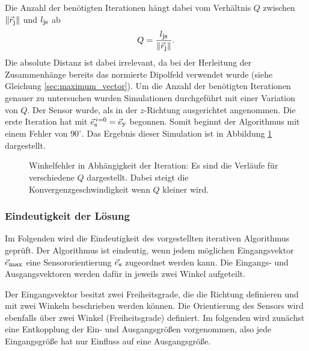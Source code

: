Die Anzahl der benötigten Iterationen hängt dabei vom Verhältnis $Q$ zwischen $\|\vec{r}_{\textrm{\footnotesize{j}}}\|$ und $l_{\textrm{\footnotesize{js}}}$ ab
\begin{equation}
    Q = \frac{l_{\textrm{\footnotesize{js}}}}{\|\vec{r}_{\textrm{\footnotesize{j}}}\|}.
\end{equation}
Die absolute Distanz ist dabei irrelevant, da bei der Herleitung der Zusammenhänge bereits das normierte Dipolfeld verwendet wurde (siehe Gleichung \ref{sec:maximum_vector}). Um die Anzahl der benötigten Iterationen genauer zu untersuchen wurden Simulationen durchgeführt mit einer Variation von $Q$. Der Sensor wurde, als in der $z$-Richtung ausgerichtet angenommen. Die erste Iteration hat mit $\vec{e}_{\textrm{\footnotesize{s}}}^{\,i=0} = \vec{e}_{\textrm{\footnotesize{y}}}$ begonnen. Somit beginnt der Algorithmus mit einem Fehler von $90^\circ$. Das Ergebnis dieser Simulation ist in Abbildung \ref{fig:ConvergenceSpeed} dargestellt.
\begin{figure}
    \centering
    \caption{Winkelfehler in Abhängigkeit der Iteration: Es sind die Verläufe für verschiedene $Q$ dargestellt. Dabei steigt die Konvergenzgeschwindigkeit wenn $Q$ kleiner wird. }
    \label{fig:ConvergenceSpeed}
\end{figure}

\subsubsection{Eindeutigkeit der Lösung}
\label{subsubsection:eindeutigkeit}
	Im Folgenden wird die Eindeutigkeit des vorgestellten iterativen Algorithmus geprüft. Der Algorithmus ist eindeutig, wenn jedem möglichen Eingangsvektor $\vec{e}_{\textrm{\footnotesize{max}}}$ eine Sensororientierung $\vec{e}_{\textrm{\footnotesize{s}}}$ zugeordnet werden kann. Die Eingangs- und Ausgangsvektoren werden dafür in jeweils zwei Winkel aufgeteilt. 

    Der Eingangsvektor besitzt zwei Freiheitsgrade, die die Richtung definieren und mit zwei Winkeln beschrieben werden können. Die Orientierung des Sensors wird ebenfalls über zwei Winkel (Freiheitsgrade) definiert. Im folgenden wird zunächst eine Entkopplung der Ein- und Ausgangsgrößen vorgenommen, also jede Eingangsgröße hat nur Einfluss auf eine Ausgangsgröße. 

